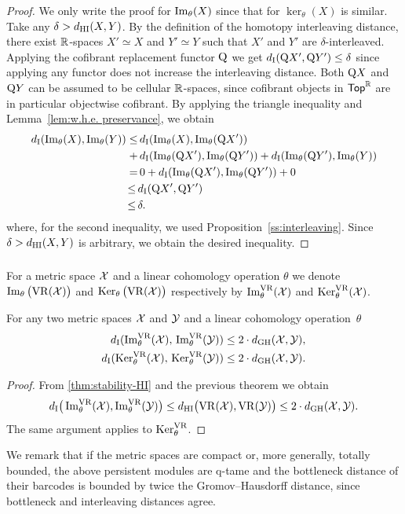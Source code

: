 \begin{proof}
	We only write the proof for $\operatorname{Im}_\theta(X)$ since that for $\ker_\theta(X)$ is similar.
	Take any $\delta > d_{\mathrm{HI}}(X,Y)$.
	By the definition of the homotopy interleaving distance, there exist $\mathbb{R}$-spaces $X' \simeq X$ and $Y' \simeq Y$ such that $X'$ and $Y'$ are $\delta$-interleaved.
	Applying the cofibrant replacement functor $\mathrm{Q}$ we get $d_{\mathrm{I}}(\mathrm{Q} X', \mathrm{Q} Y') \leq \delta$ since applying any functor does not increase the interleaving distance.
	Both $\mathrm{Q} X$ and $\mathrm{Q} Y$ can be assumed to be cellular $\mathbb{R}$-spaces, since cofibrant objects in $\mathsf{Top}^{\mathbb{R}}$ are in particular objectwise cofibrant.
	By applying the triangle inequality and Lemma~\ref{lem:w.h.e. preservance}, we obtain
	\begin{align*}
		d_{\mathrm{I}}(\operatorname{Im}_\theta(X), \operatorname{Im}_\theta(Y)) \leq& \,
		d_{\mathrm{I}}(\operatorname{Im}_\theta(X), \operatorname{Im}_\theta(\mathrm{Q} X')) \\ +& \,
		d_{\mathrm{I}}(\operatorname{Im}_\theta(\mathrm{Q} X'), \operatorname{Im}_\theta(\mathrm{Q} Y')) + d_{\mathrm{I}}(\operatorname{Im}_\theta(\mathrm{Q} Y'), \operatorname{Im}_\theta(Y)) \\ =& \,
		0 + d_{\mathrm{I}}(\operatorname{Im}_\theta(\mathrm{Q} X'), \operatorname{Im}_\theta(\mathrm{Q} Y')) + 0 \\ \leq \,&
		d_{\mathrm{I}}(\mathrm{Q} X', \mathrm{Q} Y') \\ \leq \,&
		\delta.
	\end{align*}
	where, for the second inequality, we used Proposition~\ref{ss:interleaving}.
	Since $\delta > d_{\mathrm{HI}}(X,Y)$ is arbitrary, we obtain the desired inequality.
\end{proof}

\subsubsection{}\label{thm:stability VR}

For a metric space \(\mathcal{X}\) and a linear cohomology operation \(\theta\) we denote \(\operatorname{Im}_\theta\big(\mathrm{VR}(\mathcal{X})\big)\) and \(\operatorname{Ker}_\theta\big(\mathrm{VR}(\mathcal{X})\big)\) respectively by \(\operatorname{Im}_\theta^{\mathrm{VR}}(\mathcal{X})\) and \(\operatorname{Ker}_\theta^{\mathrm{VR}}(\mathcal{X})\).

\theorem
For any two metric spaces $\mathcal{X}$ and $\mathcal{Y}$ and a linear cohomology operation~$\theta$
\begin{align*}
	d_{\mathrm{I}}(\operatorname{Im}_\theta^{\mathrm{VR}}(\mathcal{X}),\, \operatorname{Im}_\theta^{\mathrm{VR}}(\mathcal{Y})) \leq 2 \cdot d_{\mathrm{GH}}(\mathcal{X},\mathcal{Y}), \\
	d_{\mathrm{I}}(\operatorname{Ker}_\theta^{\mathrm{VR}}(\mathcal{X}),\, \operatorname{Ker}_\theta^{\mathrm{VR}}(\mathcal{Y})) \leq 2 \cdot d_{\mathrm{GH}}(\mathcal{X},\mathcal{Y}).
\end{align*}

\begin{proof}
	From \cref{thm:stability-HI} and the previous theorem we obtain
	\[
	d_{\mathrm{I}}\big(\operatorname{Im}_\theta^{\mathrm{VR}}(\mathcal{X}), \operatorname{Im}_\theta^{\mathrm{VR}}(\mathcal{Y})\big) \leq
	d_{\mathrm{HI}}\big(\mathrm{VR}(\mathcal{X}), \mathrm{VR}(\mathcal{Y})\big) \leq 2 \cdot d_{\mathrm{GH}}(\mathcal{X},\mathcal{Y}).
	\]
	The same argument applies to $\operatorname{Ker}_\theta^{\mathrm{VR}}$.
\end{proof}

We remark that if the metric spaces are compact or, more generally, totally bounded, the above persistent modules are q-tame and the bottleneck distance of their barcodes is bounded by twice the Gromov--Hausdorff distance, since bottleneck and interleaving distances agree.